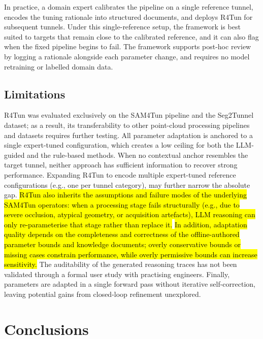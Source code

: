 \documentclass[a4paper,fleqn]{cas-dc}
\begin{document}
{In practice, a domain expert calibrates the pipeline on a single reference tunnel, encodes the tuning rationale into structured documents, and deploys R4Tun for subsequent tunnels. Under this single-reference setup, the framework is best suited to targets that remain close to the calibrated reference, and it can also flag when the fixed pipeline begins to fail. The framework supports post-hoc review by logging a rationale alongside each parameter change, and requires no model retraining or labelled domain data.


\subsection{Limitations}\label{sec:limitations}

R4Tun was evaluated exclusively on the SAM4Tun pipeline and the Seg2Tunnel dataset; as a result, its transferability to other point-cloud processing pipelines and datasets requires further testing. All parameter adaptation is anchored to a single expert-tuned configuration, which creates a low ceiling for both the LLM-guided and the rule-based methods. When no contextual anchor resembles the target tunnel, neither approach has sufficient information to recover strong performance. Expanding R4Tun to encode multiple expert-tuned reference configurations (e.g., one per tunnel category), may further narrow the absolute gap. \hl{R4Tun also inherits the assumptions and failure modes of the underlying SAM4Tun operators: when a processing stage fails structurally (e.g., due to severe occlusion, atypical geometry, or acquisition artefacts), LLM reasoning can only re-parameterise that stage rather than replace it.} \hl{In addition, adaptation quality depends on the completeness and correctness of the offline-authored parameter bounds and knowledge documents; overly conservative bounds or missing cases constrain performance, while overly permissive bounds can increase sensitivity.} The auditability of the generated reasoning traces has not been validated through a formal user study with practising engineers. Finally, parameters are adapted in a single forward pass without iterative self-correction, leaving potential gains from closed-loop refinement unexplored.

\section{Conclusions}\label{sec:conclusions}

}
\end{document}

